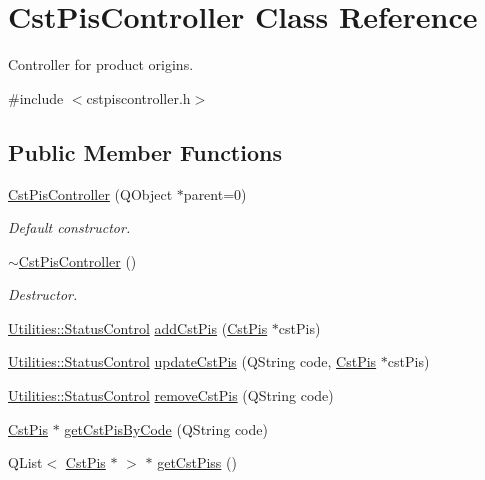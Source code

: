 \hypertarget{class_cst_pis_controller}{\section{\-Cst\-Pis\-Controller \-Class \-Reference}
\label{class_cst_pis_controller}
}


\-Controller for product origins.  




{\ttfamily \#include $<$cstpiscontroller.\-h$>$}

\subsection*{\-Public \-Member \-Functions}
\begin{DoxyCompactItemize}
\item 
\hyperlink{class_cst_pis_controller_a5eed6c26bce7dd54b213bd6085e71b40}{\-Cst\-Pis\-Controller} (\-Q\-Object $\ast$parent=0)
\begin{DoxyCompactList}\small\item\em \-Default constructor. \end{DoxyCompactList}\item 
\hyperlink{class_cst_pis_controller_ac96d6599ee664fea0264542d989b112d}{$\sim$\-Cst\-Pis\-Controller} ()
\begin{DoxyCompactList}\small\item\em \-Destructor. \end{DoxyCompactList}\item 
\hyperlink{class_utilities_a2974f062d85bdb0c444a1cbe554bf228}{\-Utilities\-::\-Status\-Control} \hyperlink{class_cst_pis_controller_a68542595e6de577f92e2834d90314893}{add\-Cst\-Pis} (\hyperlink{class_cst_pis}{\-Cst\-Pis} $\ast$cst\-Pis)
\item 
\hyperlink{class_utilities_a2974f062d85bdb0c444a1cbe554bf228}{\-Utilities\-::\-Status\-Control} \hyperlink{class_cst_pis_controller_afdf6e05c0ed6b4ec96f906f3cb9c2a17}{update\-Cst\-Pis} (\-Q\-String code, \hyperlink{class_cst_pis}{\-Cst\-Pis} $\ast$cst\-Pis)
\item 
\hyperlink{class_utilities_a2974f062d85bdb0c444a1cbe554bf228}{\-Utilities\-::\-Status\-Control} \hyperlink{class_cst_pis_controller_a855d066f6f9591780191dc246bab9800}{remove\-Cst\-Pis} (\-Q\-String code)
\item 
\hyperlink{class_cst_pis}{\-Cst\-Pis} $\ast$ \hyperlink{class_cst_pis_controller_affbb931c6504a681e4bcc250fb276451}{get\-Cst\-Pis\-By\-Code} (\-Q\-String code)
\item 
\-Q\-List$<$ \hyperlink{class_cst_pis}{\-Cst\-Pis} $\ast$ $>$ $\ast$ \hyperlink{class_cst_pis_controller_a5565589529f28310cacff31edb85dc95}{get\-Cst\-Piss} ()
\end{DoxyCompactItemize}


